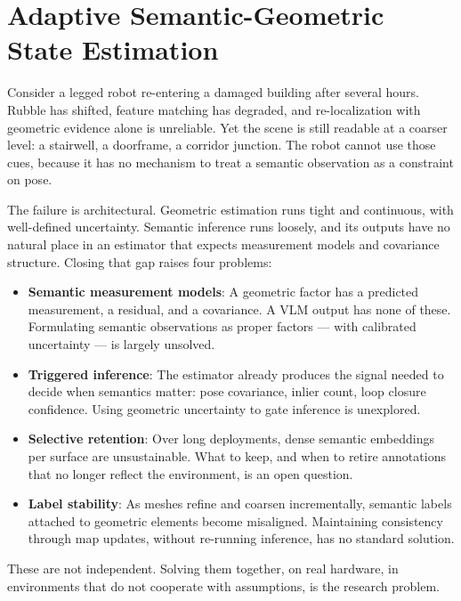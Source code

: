 \documentclass[11pt,a4paper]{article}
\begin{document}
\section*{Adaptive Semantic-Geometric State Estimation}

Consider a legged robot re-entering a damaged building after several 
hours. Rubble has shifted, feature matching has degraded, and 
re-localization with geometric evidence alone is unreliable. Yet the 
scene is still readable at a coarser level: a stairwell, a doorframe, 
a corridor junction. The robot cannot use those cues, because it has 
no mechanism to treat a semantic observation as a constraint on pose.

The failure is architectural. Geometric estimation runs tight and 
continuous, with well-defined uncertainty. Semantic inference runs 
loosely, and its outputs have no natural place in an estimator that 
expects measurement models and covariance structure. Closing that gap raises four problems:

\begin{itemize}
  \item \textbf{Semantic measurement models}: A geometric factor 
  has a predicted measurement, a residual, and a covariance. 
  A VLM output has none of these. Formulating semantic observations 
  as proper factors — with calibrated uncertainty — is largely 
  unsolved.

  \item \textbf{Triggered inference}: The estimator already 
  produces the signal needed to decide when semantics matter: pose 
  covariance, inlier count, loop closure confidence. Using geometric 
  uncertainty to gate inference is unexplored.

  \item \textbf{Selective retention}: Over long deployments, dense 
  semantic embeddings per surface are unsustainable. What to keep, 
  and when to retire annotations that no longer reflect the 
  environment, is an open question.

  \item \textbf{Label stability}: As meshes refine and coarsen 
  incrementally, semantic labels attached to geometric elements 
  become misaligned. Maintaining consistency through map updates, 
  without re-running inference, has no standard solution.
\end{itemize}

These are not independent. Solving them together, on real hardware, 
in environments that do not cooperate with assumptions, is the research problem.
\end{document}
